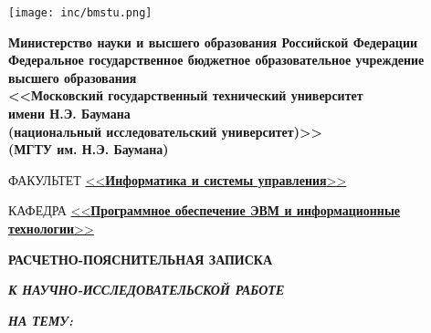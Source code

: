 \begin{titlepage}
    \noindent\begin{minipage}{0.05\textwidth}
                 \texttt{[image: inc/bmstu.png]}
    \end{minipage}
    \hfill
    \begin{minipage}{0.85\textwidth}\raggedleft
    \begin{center}
        \fontsize{12pt}{0.3\baselineskip}\selectfont \textbf{Министерство науки и высшего образования Российской Федерации \\ Федеральное государственное бюджетное образовательное учреждение \\ высшего образования \\ <<Московский государственный технический университет \\ имени Н.Э. Баумана \\ (национальный исследовательский университет)>> \\ (МГТУ им. Н.Э. Баумана)}
    \end{center}
    \end{minipage}

    \begin{center}
        \fontsize{12pt}{0.1\baselineskip}\selectfont
        \noindent\makebox[\linewidth]{\rule{\textwidth}{4pt}} \makebox[\linewidth]{\rule{\textwidth}{1pt}}
    \end{center}

    \begin{flushleft}
        \fontsize{12pt}{0.8\baselineskip}\selectfont

        ФАКУЛЬТЕТ \uline{<<\textbf{Информатика и системы управления}>> \hfill}

        КАФЕДРА \uline{\mbox{\hspace{4mm}} <<\textbf{Программное обеспечение ЭВМ и информационные технологии}>> \hfill}
    \end{flushleft}

    \vfill

    \begin{center}
        \fontsize{20pt}{\baselineskip}\selectfont

        \textbf{РАСЧЕТНО-ПОЯСНИТЕЛЬНАЯ ЗАПИСКА}

        \textbf{\textit{К НАУЧНО-ИССЛЕДОВАТЕЛЬСКОЙ РАБОТЕ}}

        \textbf{\textit{НА ТЕМУ:}}
    \end{center}

    \begin{center}
        \fontsize{18pt}{0.6cm}\selectfont


\end{center}
\end{titlepage}
